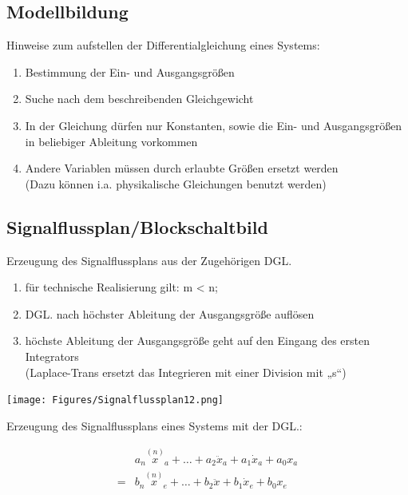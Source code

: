 \documentclass[10pt,a4paper]{article}
\begin{document}
\subsection{Modellbildung}
Hinweise zum aufstellen der Differentialgleichung eines Systems:
\begin{mdframed}[style=exercise]
	\begin{enumerate}
		\item Bestimmung der Ein- und Ausgangsgrößen
		\item Suche nach dem beschreibenden Gleichgewicht
		\item In der Gleichung dürfen nur Konstanten, sowie die Ein- und
		      Ausgangsgrößen in beliebiger Ableitung vorkommen
		\item Andere Variablen müssen durch erlaubte Größen ersetzt werden\\
		      \footnotesize
		      (Dazu können i.a. physikalische Gleichungen benutzt werden)
	\end{enumerate}
\end{mdframed}

\subsection{Signalflussplan/Blockschaltbild}
Erzeugung des Signalflussplans aus der Zugehörigen DGL.
\begin{mdframed}[style=exercise]
	\begin{enumerate}
		\item für technische Realisierung gilt: m < n;

		\item DGL. nach höchster Ableitung der Ausgangsgröße auflösen

		\item höchste Ableitung der Ausgangsgröße geht auf den Eingang des ersten Integrators\\
		      \footnotesize
		      (Laplace-Trans ersetzt das Integrieren mit einer Division mit „s“)
	\end{enumerate}
\end{mdframed}
\begin{center}
	\texttt{[image: Figures/Signalflussplan12.png]}
\end{center}

Erzeugung des Signalflussplans eines Systems mit der DGL.:

\begin{align*}
	  & a_{n} \overset{(n)}{x}_{a}+\ldots+a_{2} \ddot{x}_{a}+a_{1} \dot{x}_{a}+a_{0} x_{a} \\
	= & b_{n} \overset{(n)}{x}_{e}+\ldots+b_{2} \ddot{x}+b_{1} \dot{x}_{e}+b_{0} x_{e}
\end{align*}
\end{document}
